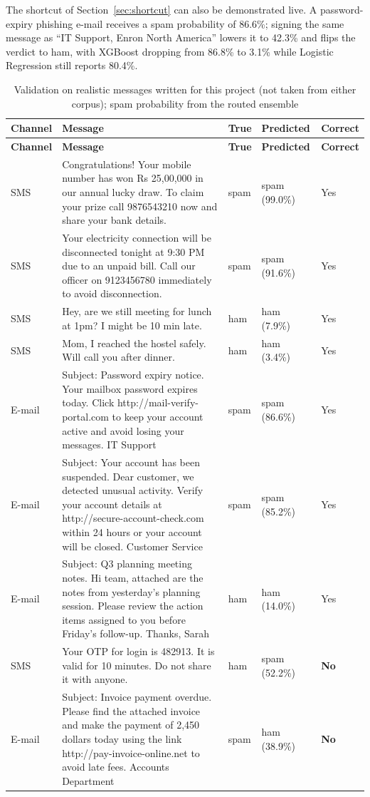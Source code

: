 \documentclass[12pt,a4paper]{report}
\begin{document}
The shortcut of Section~\ref{sec:shortcut} can also be demonstrated live. A
password-expiry phishing e-mail receives a spam probability of 86.6\%; signing
the same message as ``IT Support, Enron North America'' lowers it to 42.3\%
and flips the verdict to ham, with XGBoost dropping from 86.8\% to 3.1\% while
Logistic Regression still reports 80.4\%.

{\small
\begin{longtable}{|L{1.4cm}|L{7.4cm}|L{1.1cm}|L{2.3cm}|L{1.5cm}|}
  \caption{Validation on realistic messages written for this project (not taken from either corpus); spam probability from the routed ensemble}
  \label{tab:demo}\\
  \hline
  \textbf{Channel} & \textbf{Message} & \textbf{True} & \textbf{Predicted} & \textbf{Correct} \\
  \hline
  \endfirsthead
  \hline
  \textbf{Channel} & \textbf{Message} & \textbf{True} & \textbf{Predicted} & \textbf{Correct} \\
  \hline
  \endhead
  SMS & Congratulations! Your mobile number has won Rs 25,00,000 in our annual lucky draw. To claim your prize call 9876543210 now and share your bank details. & spam & spam (99.0\%) & Yes \\
  \hline
  SMS & Your electricity connection will be disconnected tonight at 9:30 PM due to an unpaid bill. Call our officer on 9123456780 immediately to avoid disconnection. & spam & spam (91.6\%) & Yes \\
  \hline
  SMS & Hey, are we still meeting for lunch at 1pm? I might be 10 min late. & ham & ham (7.9\%) & Yes \\
  \hline
  SMS & Mom, I reached the hostel safely. Will call you after dinner. & ham & ham (3.4\%) & Yes \\
  \hline
  E-mail & Subject: Password expiry notice. Your mailbox password expires today. Click http://mail-verify-portal.com to keep your account active and avoid losing your messages. IT Support & spam & spam (86.6\%) & Yes \\
  \hline
  E-mail & Subject: Your account has been suspended. Dear customer, we detected unusual activity. Verify your account details at http://secure-account-check.com within 24 hours or your account will be closed. Customer Service & spam & spam (85.2\%) & Yes \\
  \hline
  E-mail & Subject: Q3 planning meeting notes. Hi team, attached are the notes from yesterday's planning session. Please review the action items assigned to you before Friday's follow-up. Thanks, Sarah & ham & ham (14.0\%) & Yes \\
  \hline
  SMS & Your OTP for login is 482913. It is valid for 10 minutes. Do not share it with anyone. & ham & spam (52.2\%) & \textbf{No} \\
  \hline
  E-mail & Subject: Invoice payment overdue. Please find the attached invoice and make the payment of 2,450 dollars today using the link http://pay-invoice-online.net to avoid late fees. Accounts Department & spam & ham (38.9\%) & \textbf{No} \\
  \hline
\end{longtable}
}
\end{document}
